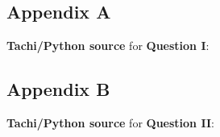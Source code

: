 \documentclass{mcmthesis}
\begin{document}


\subsection{Appendix A}
\textbf{\textcolor[rgb]{0.98,0.00,0.00}{Tachi/Python source}} for \textbf{\textcolor[rgb]{0.00,0.00,0.98}{Question I}}:


\subsection{Appendix B}
\textbf{\textcolor[rgb]{0.98,0.00,0.00}{Tachi/Python source}} for \textbf{\textcolor[rgb]{0.00,0.00,0.98}{Question II}}:

\end{document}
